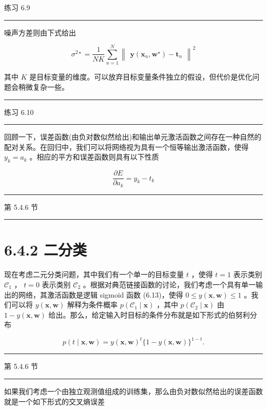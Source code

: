 \documentclass[10pt]{report}
\newcommand{\HRule}{\begin{center}\rule{0.9\linewidth}{0.2mm}\end{center}}
\begin{document}
练习 6.9

\HRule

噪声方差则由下式给出

\[
{\sigma }^{2 \star  } = \frac{1}{NK}\mathop{\sum }\limits_{{n = 1}}^{N}{\begin{Vmatrix}\mathbf{y}\left( {\mathbf{x}}_{n},{\mathbf{w}}^{ \star  }\right)  - {\mathbf{t}}_{n}\end{Vmatrix}}^{2} \tag{6.30}
\]

其中 \(K\) 是目标变量的维度。可以放弃目标变量条件独立的假设，但代价是优化问题会稍微复杂一些。

\HRule

练习 6.10

\HRule

回顾一下，误差函数(由负对数似然给出)和输出单元激活函数之间存在一种自然的配对关系。在回归中，我们可以将网络视为具有一个恒等输出激活函数，使得 \({y}_{k} = {a}_{k}\) 。相应的平方和误差函数则具有以下性质

\[
\frac{\partial E}{\partial {a}_{k}} = {y}_{k} - {t}_{k} \tag{6.31}
\]

\HRule

第 5.4.6 节

\HRule

\section*{6.4.2 二分类}

现在考虑二元分类问题，其中我们有一个单一的目标变量 \(t\) ，使得 \(t = 1\) 表示类别 \({\mathcal{C}}_{1}\) ， \(t = 0\) 表示类别 \({\mathcal{C}}_{2}\) 。根据对典范链接函数的讨论，我们考虑一个具有单一输出的网络，其激活函数是逻辑 sigmoid 函数 (6.13)，使得 \(0 \leq  y\left( {\mathbf{x},\mathbf{w}}\right)  \leq  1\) 。我们可以将 \(y\left( {\mathbf{x},\mathbf{w}}\right)\) 解释为条件概率 \(p\left( {{\mathcal{C}}_{1} \mid  \mathbf{x}}\right)\) ，其中 \(p\left( {{\mathcal{C}}_{2} \mid  \mathbf{x}}\right)\) 由 \(1 - y\left( {\mathbf{x},\mathbf{w}}\right)\) 给出。那么，给定输入时目标的条件分布就是如下形式的伯努利分布

\[
p\left( {t \mid  \mathbf{x},\mathbf{w}}\right)  = y{\left( \mathbf{x},\mathbf{w}\right) }^{t}\{ 1 - y\left( {\mathbf{x},\mathbf{w}}\right) {\} }^{1 - t}. \tag{6.32}
\]

\HRule

第 5.4.6 节

\HRule

如果我们考虑一个由独立观测值组成的训练集，那么由负对数似然给出的误差函数就是一个如下形式的交叉熵误差
\end{document}
